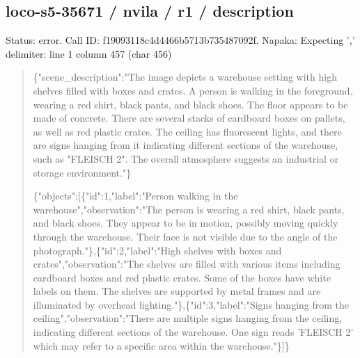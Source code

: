 \documentclass[10pt,a4paper]{article}
\begin{document}
\subsection*{loco-s5-35671 / nvila / r1 / description}
Status: error. Call ID: f19093118c4d4466b5713b735487092f. Napaka: Expecting ',' delimiter: line 1 column 457 (char 456)
\begin{quote}\footnotesize
\{"scene\_description":\allowbreak{}"The image depicts a warehouse setting with high shelves filled with boxes and crates. A person is walking in the foreground,\allowbreak{} wearing a red shirt,\allowbreak{} black pants,\allowbreak{} and black shoes. The floor appears to be made of concrete. There are several stacks of cardboard boxes on pallets,\allowbreak{} as well as red plastic crates. The ceiling has fluorescent lights,\allowbreak{} and there are signs hanging from it indicating different sections of the warehouse,\allowbreak{} such as "FLEISCH 2". The overall atmosphere suggests an industrial or storage environment."\}\par
\par
\{"objects":\allowbreak{}[\{"id":\allowbreak{}1,\allowbreak{}"label":\allowbreak{}"Per\allowbreak{}son walking in the warehouse",\allowbreak{}"observation":\allowbreak{}"The person is wearing a red shirt,\allowbreak{} black pants,\allowbreak{} and black shoes. They appear to be in motion,\allowbreak{} possibly moving quickly through the warehouse. Their face is not visible due to the angle of the photograph."\},\allowbreak{}\{"id":\allowbreak{}2,\allowbreak{}"label":\allowbreak{}"H\allowbreak{}igh shelves with boxes and crates",\allowbreak{}"observation":\allowbreak{}"The shelves are filled with various items including cardboard boxes and red plastic crates. Some of the boxes have white labels on them. The shelves are supported by metal frames and are illuminated by overhead lighting."\},\allowbreak{}\{"id":\allowbreak{}3,\allowbreak{}"label":\allowbreak{}"Sig\allowbreak{}ns hanging from the ceiling",\allowbreak{}"observation":\allowbreak{}"There are multiple signs hanging from the ceiling,\allowbreak{} indicating different sections of the warehouse. One sign reads 'FLEISCH 2' which may refer to a specific area within the warehouse."\}]\}
\end{quote}
\end{document}
